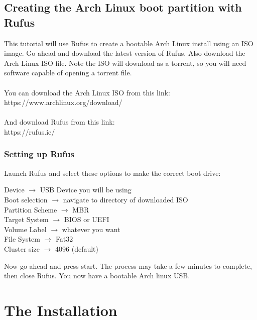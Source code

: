 \documentclass[12pt]{article}
\begin{document}
\color{pink}
\subsection*{Creating the Arch Linux boot partition with Rufus} \color{white}

\begin{adjustwidth}{0.5cm}{}
This tutorial will use Rufus to create a bootable Arch Linux install using an ISO image. Go ahead and download the latest version of Rufus. Also download the Arch Linux ISO file. Note the ISO will download as a torrent, so you will need software capable of opening a torrent file.\\\\
You can download the Arch Linux ISO from this link:\\
https://www.archlinux.org/download/\\\\
And download Rufus from this link:\\
https://rufus.ie/
\end{adjustwidth}
\color{pink}
\subsubsection*{Setting up Rufus} \color{white}

\begin{adjustwidth}{0.5cm}{}
Launch Rufus and select these options to make the correct boot drive:\\
\begin{adjustwidth}{0.5cm}{}
Device $\rightarrow$ USB Device you will be using\\
Boot selection $\rightarrow$ navigate to directory of downloaded ISO\\
Partition Scheme $\rightarrow$ MBR\\
Target System $\rightarrow$ BIOS or UEFI\\
Volume Label $\rightarrow$ whatever you want\\
File System $\rightarrow$ Fat32\\
Cluster size $\rightarrow$ 4096 (default)\\
\end{adjustwidth}


Now go ahead and press start. The process may take a few minutes to complete, then close Rufus. You now have a bootable Arch linux USB.
\end{adjustwidth}
\color{pink}
\section*{The Installation} \color{white}
\end{document}
